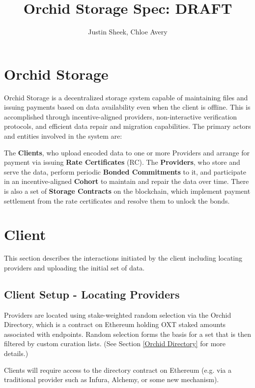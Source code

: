 \documentclass{article}
\title{Orchid Storage Spec: DRAFT}
\author{Justin Sheek, Chloe Avery}
\begin{document}
\maketitle
\tableofcontents
\vspace{.7in}

\section{Orchid Storage}

Orchid Storage is a decentralized storage system capable of maintaining files and issuing payments based on data availability even when the client is offline. This is accomplished through incentive-aligned providers, non-interactive verification protocols, and efficient data repair and migration capabilities. The primary actors and entities involved in the system are: 

The \textbf{Clients}, who upload encoded data to one or more Providers and arrange for payment via issuing \textbf{Rate Certificates} (RC).  
The \textbf{Providers}, who store and serve the data, perform periodic \textbf{Bonded Commitments} to it, and participate in an incentive-aligned \textbf{Cohort} to maintain and repair the data over time.  
There is also a set of \textbf{Storage Contracts} on the blockchain, which implement payment settlement from the rate certificates and resolve them to unlock the bonds.

\section{Client}
This section describes the interactions initiated by the client including locating providers and uploading the initial set of data.

\subsection{Client Setup - Locating Providers}

Providers are located using stake-weighted random selection via the Orchid Directory, which is a contract on Ethereum holding OXT staked amounts associated with endpoints.  Random selection forms the basis for a set that is then filtered by custom curation lists.  (See Section \ref{Orchid Directory} for more details.)

Clients will require access to the directory contract on Ethereum (e.g. via a traditional provider such as Infura, Alchemy, or some new mechanism).
\end{document}

